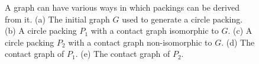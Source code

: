 \begin{figure}[htbp]
    \centering
    \caption{A graph can have various ways in which packings can be derived from it. (a) The initial graph $G$ used to generate a circle packing. (b) A circle packing $P_1$ with a contact graph isomorphic to $G$. (c) A circle packing $P_2$ with a contact graph non-isomorphic to $G$. (d) The contact graph of $P_1$. (e) The contact graph of $P_2$.}
    \label{fig: isomorphic vs non-isomorphic packings}
\end{figure}

